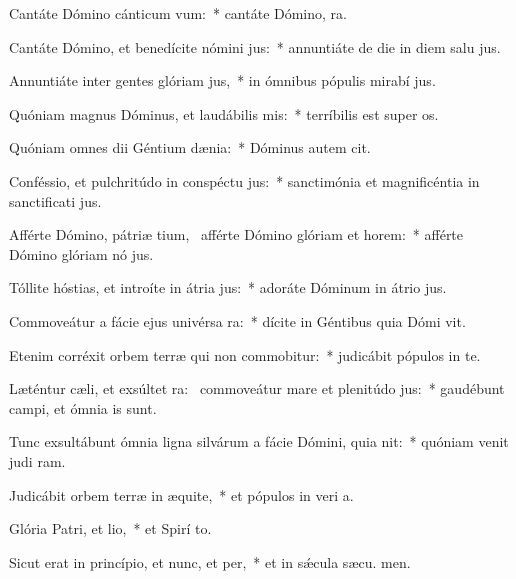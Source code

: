\item Cantáte Dómino cánticum vum:~* cantáte Dómino,  ra.
\item Cantáte Dómino, et benedícite nómini jus:~* annuntiáte de die in diem salu jus.
\item Annuntiáte inter gentes glóriam jus,~* in ómnibus pópulis mirabí jus.
\item Quóniam magnus Dóminus, et laudábilis mis:~* terríbilis est super  os.
\item Quóniam omnes dii Géntium dænia:~* Dóminus autem  cit.
\item Conféssio, et pulchritúdo in conspéctu jus:~* sanctimónia et magnificéntia in sanctificati jus.
\item Afférte Dómino, pátriæ tium,~\pscross{} afférte Dómino glóriam et horem:~* afférte Dómino glóriam nó jus.
\item Tóllite hóstias, et introíte in átria jus:~* adoráte Dóminum in átrio  jus.
\item Commoveátur a fácie ejus univérsa ra:~* dícite in Géntibus quia Dómi vit.
\item Etenim corréxit orbem terræ qui non commobitur:~* judicábit pópulos in te.
\item Læténtur cæli, et exsúltet ra:~\pscross{} commoveátur mare et plenitúdo jus:~* gaudébunt campi, et ómnia   is sunt.
\item Tunc exsultábunt ómnia ligna silvárum a fácie Dómini, quia nit:~* quóniam venit judi ram.
\item Judicábit orbem terræ in æquite,~* et pópulos in veri a.
\item Glória Patri, et lio,~* et Spirí to.
\item Sicut erat in princípio, et nunc, et per,~* et in sǽcula sæcu. men.
